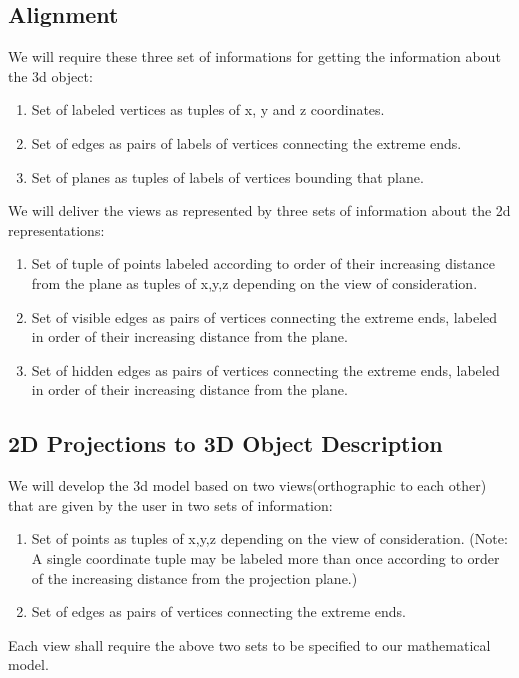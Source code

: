 \documentclass[12pt]{report}
\begin{document}
\subsection*{Alignment}
We will require these three set of informations for getting the information about the 3d object:
\begin{enumerate}
\item Set of labeled vertices as tuples of x, y and z coordinates.
\item Set of edges as pairs of labels of vertices connecting the extreme ends.
\item Set of planes as tuples of labels of vertices bounding that plane.
\end{enumerate}
We will deliver the views as represented by three sets of information about the 2d representations:
\begin{enumerate}
\item Set of tuple of points labeled according to order of their increasing distance from the plane as tuples of x,y,z depending on the view of consideration.
\item Set of visible edges as pairs of vertices connecting the extreme ends, labeled in order of their increasing distance from the plane. 
\item Set of hidden edges as pairs of vertices connecting the extreme ends, labeled in order of their increasing distance from the plane.
\end{enumerate}


\subsection*{2D Projections to 3D Object Description}
We will develop the 3d model based on two views(orthographic to each other) that are given by the user in two sets of information:
\begin{enumerate}
\item Set of points as tuples of x,y,z depending on the view of consideration. (Note: A single coordinate tuple may be labeled more than once according to order of the increasing distance from the projection plane.)
\item Set of edges as pairs of vertices connecting the extreme ends.
\end{enumerate}
Each view shall require the above two sets to be specified to our mathematical model.
\end{document}
